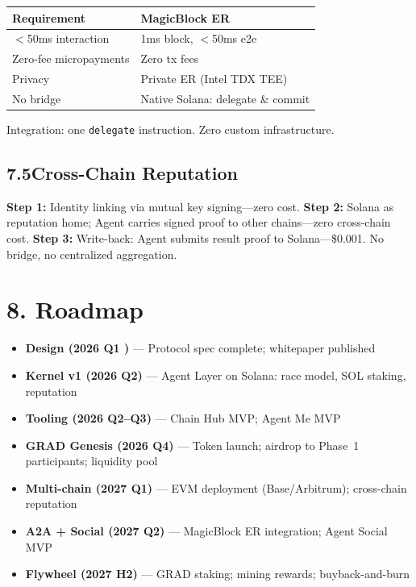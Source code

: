 \documentclass[11pt,a4paper]{article}
\begin{document}
\begin{table}[H]\centering\small
\begin{tabular}{@{}ll@{}}
\toprule
\textbf{Requirement} & \textbf{MagicBlock ER} \\
\midrule
$<$50ms interaction & 1ms block, $<$50ms e2e \\
Zero-fee micropayments & Zero tx fees \\
Privacy & Private ER (Intel TDX TEE) \\
No bridge & Native Solana: delegate \& commit \\
\bottomrule
\end{tabular}
\end{table}

Integration: one \texttt{delegate} instruction. Zero custom infrastructure.

\subsection{7.5\quad Cross-Chain Reputation}
\textbf{Step 1:} Identity linking via mutual key signing---zero cost. \textbf{Step 2:} Solana as reputation home; Agent carries signed proof to other chains---zero cross-chain cost. \textbf{Step 3:} Write-back: Agent submits result proof to Solana---\$0.001. No bridge, no centralized aggregation.

\section{8. Roadmap}

\begin{itemize}[nosep]
  \item \textbf{Design (2026 Q1 \checkmark)} --- Protocol spec complete; whitepaper published
  \item \textbf{Kernel v1 (2026 Q2)} --- Agent Layer on Solana: race model, SOL staking, reputation
  \item \textbf{Tooling (2026 Q2--Q3)} --- Chain Hub MVP; Agent Me MVP
  \item \textbf{GRAD Genesis (2026 Q4)} --- Token launch; airdrop to Phase~1 participants; liquidity pool
  \item \textbf{Multi-chain (2027 Q1)} --- EVM deployment (Base/Arbitrum); cross-chain reputation
  \item \textbf{A2A + Social (2027 Q2)} --- MagicBlock ER integration; Agent Social MVP
  \item \textbf{Flywheel (2027 H2)} --- GRAD staking; mining rewards; buyback-and-burn
\end{itemize}
\end{document}
